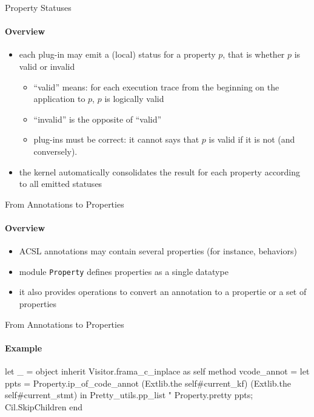 
\begin{frame}{Property Statuses}
\framesubtitle{Overview}

\begin{itemize}
\item each plug-in may emit a (local) status for a property $p$, that is
  whether $p$ is valid or invalid
  \begin{itemize}
  \item ``valid'' means: for each execution trace from the beginning on the
    application to $p$, $p$ is  logically valid
  \item ``invalid'' is the opposite of ``valid''
  \item plug-ins must be correct: it cannot says that $p$ is valid
    if it is not (and conversely).
  \end{itemize}
\item the kernel automatically consolidates the result for each property
  according to all emitted statuses
\end{itemize}

\end{frame}


\begin{frame}{From Annotations to Properties}
  \framesubtitle{Overview}

\begin{itemize}
\item ACSL annotations may contain several properties (for instance, behaviors)
\item module \lstinline+Property+ defines properties as a single datatype
\item it also provides operations to convert an annotation to a propertie or a
  set of properties
\end{itemize}

\end{frame}


\begin{frame}[fragile]{From Annotations to Properties}
  \framesubtitle{Example}

\begin{ocamlcode}
let _ = object
  inherit Visitor.frama_c_inplace as self
  method vcode_annot =
    let ppts = 
      Property.ip_of_code_annot 
        (Extlib.the self#current_kf)
        (Extlib.the self#current_stmt)
    in
    Pretty_utils.pp_list "%
      Property.pretty ppts;    
    Cil.SkipChildren	
end
\end{ocamlcode}

\end{frame}

